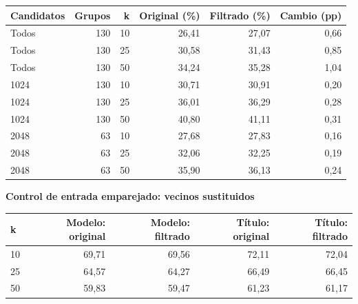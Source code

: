\par\noindent\begin{minipage}{\linewidth}
\small
\setlength{\tabcolsep}{3pt}
\renewcommand{\arraystretch}{1.15}
\label{tab:S19}
\begin{tabular*}{\linewidth}{@{\extracolsep{\fill}}lrrrrr@{}}
\toprule
\textbf{Candidatos} & \textbf{Grupos} & \textbf{k} & \textbf{Original (\%)} & \textbf{Filtrado (\%)} & \textbf{Cambio (pp)} \\
\midrule
Todos & 130 & 10 & 26,41 & 27,07 & 0,66 \\[2pt]
Todos & 130 & 25 & 30,58 & 31,43 & 0,85 \\[2pt]
Todos & 130 & 50 & 34,24 & 35,28 & 1,04 \\[2pt]
1024 & 130 & 10 & 30,71 & 30,91 & 0,20 \\[2pt]
1024 & 130 & 25 & 36,01 & 36,29 & 0,28 \\[2pt]
1024 & 130 & 50 & 40,80 & 41,11 & 0,31 \\[2pt]
2048 & 63 & 10 & 27,68 & 27,83 & 0,16 \\[2pt]
2048 & 63 & 25 & 32,06 & 32,25 & 0,19 \\[2pt]
2048 & 63 & 50 & 35,90 & 36,13 & 0,24 \\[2pt]
\bottomrule
\end{tabular*}

\par\medskip\textbf{Control de entrada emparejado: vecinos sustituidos}\par\smallskip
\begin{tabular*}{\linewidth}{@{\extracolsep{\fill}}lrrrr@{}}
\toprule
\textbf{k} & \textbf{Modelo: original} & \textbf{Modelo: filtrado} & \textbf{Título: original} & \textbf{Título: filtrado} \\
\midrule
10 & 69,71 & 69,56 & 72,11 & 72,04 \\[2pt]
25 & 64,57 & 64,27 & 66,49 & 66,45 \\[2pt]
50 & 59,83 & 59,47 & 61,23 & 61,17 \\[2pt]
\bottomrule
\end{tabular*}
\par{}
\end{minipage}\par
